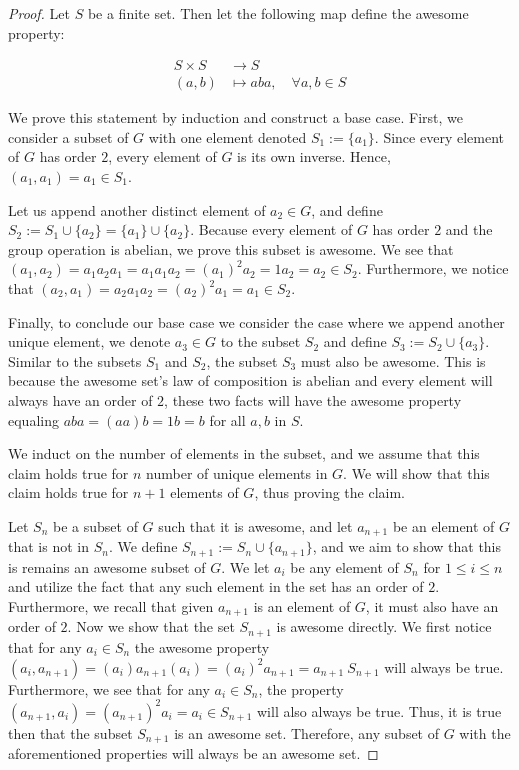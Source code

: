 \documentclass[a4paper,12pt]{article}
\begin{document}
\begin{proof}
    Let $S$ be a finite set. Then let the following map define the awesome property:

    \begin{align*}
        S \times S & \rightarrow S \\
        (a, b) &\mapsto aba, \quad \forall a, b \in S
    \end{align*}

    We prove this statement by induction and construct a base case. First, we consider a subset of $G$ with one element denoted $S_1 := \{a_1\}.$ Since every element of $G$ has order $2$, every element of $G$ is its own inverse. Hence,  $(a_1, a_1) = a_1 \in S_1$. 
    
    Let us append another distinct element of $a_2 \in G$, and define $S_2 := S_1 \cup \{a_2 \}= \{a_1\} \cup \{a_2\}$. Because  every element of $G$ has order $2$ and the group operation is abelian, we prove this subset is awesome. We see that $(a_1, a_2) = a_1 a_2 a_1 = a_1 a_1 a_2 = (a_1)^2 a_2 = 1 a_2 = a_2 \in S_2$. Furthermore, we notice that $(a_2, a_1) = a_2 a_1 a_2 = (a_2)^2 a_1 = a_1 \in S_2$.
    
    Finally, to conclude our base case we consider the case  where we append another unique element, we denote $a_3 \in G$ to the subset $S_2$ and define $S_3 := S_2 \cup \{a_3\}.$ Similar to the subsets $S_1$ and $S_2$, the subset $S_3$ must also be awesome. This is because the awesome set's law of composition is abelian and every element will always have an order of $2$, these two facts will have the awesome property equaling $aba = (aa)b = 1b =b$ for all $a, b$ in $S$. 

    We induct on the number of elements in the subset, and we assume that this claim holds true for $n$ number of unique elements in $G$. We will show that this claim holds true for $n+1$ elements of $G$, thus proving the claim.

    Let $S_n$ be a subset of $G$ such that it is awesome, and let $a_{n+1}$ be an element of $G$ that is not in $S_n$. We define $S_{n+1} := S_n \cup \{a_{n+1}\}$, and we aim to show that this is remains an awesome subset of $G$. We let $a_i$ be any element of $S_n$ for $1 \leq i \leq n$ and utilize the fact that any such element in the set has an order of $2$. Furthermore, we recall that given $a_{n+1}$ is an element of $G$, it must also have an order of $2$. Now we show that the set $S_{n+1}$ is awesome directly. We first notice that for any $a_i \in S_n$ the awesome property $(a_i, a_{n+1}) = (a_i) a_{n+1} (a_i) = (a_i)^2 a_{n+1} = a_{n+1} \ S_{n+1}$ will always be true. Furthermore, we see that for any $a_i \in S_n$, the property $(a_{n+1}, a_i) = (a_{n+1})^2 a_i = a_i \in S_{n+1}$ will also always be true. Thus, it is true then that the subset $S_{n+1}$ is an  awesome set. Therefore, any subset of $G$ with the aforementioned properties will always be an awesome set.

\end{proof}
\end{document}
